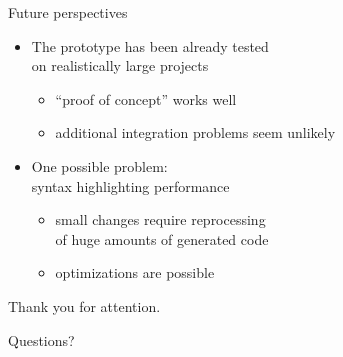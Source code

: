 \documentclass[10pt]{beamer}
\begin{document}
\begin{frame}{Future perspectives}
\begin{itemize}
\item The prototype has been already tested\\ on realistically large projects
	\begin{itemize}
		\item ``proof of concept'' works well
		\item additional integration problems seem unlikely
	\end{itemize}
\item One possible problem:\\ syntax highlighting performance
	\begin{itemize}
		\item small changes require reprocessing\\ of huge amounts of generated code
		\item optimizations are possible
	\end{itemize}
\end{itemize}
\end{frame}


\begin{frame}[standout]
  Thank you for attention.

  \small Questions?
\end{frame}
\end{document}
